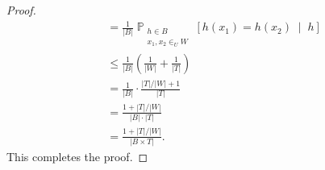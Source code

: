 \documentclass[letterpaper, reqno,11pt]{article}
\newcommand{\PP}{\mathop{{}\mathbb{P}}}
\begin{document}
\begin{enumerate}
\begin{enumerate}
\begin{proof}
\begin{align*}
        &= \frac{1}{|B|} \PP_{\substack{h \in B \\ x_1, x_2 \in_U W}} \left[h\left(x_1\right) = h\left(x_2\right) \;\middle|\; h\right] \\
        &\leq \frac{1}{|B|} \left(\frac{1}{|W|} + \frac{1}{|T|}\right) \\
        &= \frac{1}{|B|} \cdot \frac{|T|/|W| + 1}{|T|} \\
        &= \frac{1 + |T|/|W|}{|B| \cdot |T|} \\
        &= \frac{1 + |T|/|W|}{|B \times T|}.
      \end{align*}
      This completes the proof.
    \end{proof}
  \end{enumerate}
\end{enumerate}
\end{document}
